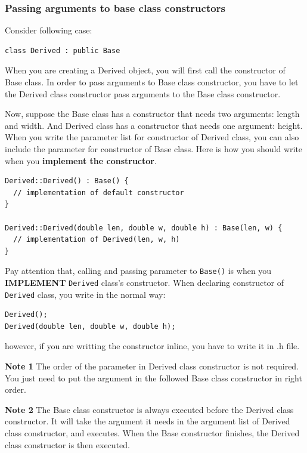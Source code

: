 \documentclass[11pt]{book}
\begin{document}
\subsubsection{Passing arguments to base class constructors}
\label{sec:orgebf992f}
Consider following case:
\begin{verbatim}
class Derived : public Base
\end{verbatim}

When you are creating a Derived object, you will first call the constructor of Base class. In order to pass arguments to Base class constructor, you have to let the Derived class constructor pass arguments to the Base class constructor.

Now, suppose the Base class has a constructor that needs two arguments: length and width. And Derived class has a constructor that needs one argument: height. When you write the parameter list for constructor of Derived class, you can also include the parameter for constructor of Base class. Here is how you should write when you \textbf{implement the constructor}.
\begin{verbatim}
Derived::Derived() : Base() {
  // implementation of default constructor 
}

Derived::Derived(double len, double w, double h) : Base(len, w) {
  // implementation of Derived(len, w, h)
}
\end{verbatim}

Pay attention that, calling and passing parameter to \texttt{Base()} is when you \textbf{IMPLEMENT} \texttt{Derived} class's constructor. When declaring constructor of \texttt{Derived} class, you write in the normal way:
\begin{verbatim}
Derived();
Derived(double len, double w, double h);
\end{verbatim}
however, if you are writting the constructor inline, you have to write it in .h file.

\textbf{Note 1} 
The order of the parameter in Derived class constructor is not required. You just need to put the argument in the followed Base class constructor in right order.

\textbf{Note 2} 
The Base class constructor is always executed before the Derived class constructor. It will take the argument it needs in the argument list of Derived class constructor, and executes. When the Base constructor finishes, the Derived class constructor is then executed.
\end{document}
